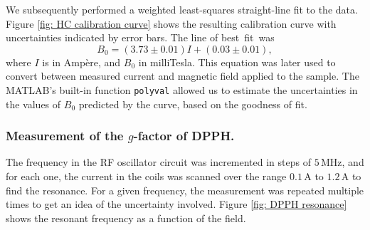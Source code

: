 \documentclass[a4paper]{jpconf}
\numberwithin{equation}{section}
\begin{document}
We subsequently performed a weighted least-squares straight-line fit to the data. Figure \ref{fig: HC calibration curve} shows the resulting calibration curve with uncertainties indicated by error bars. The line of best~fit~was 
\[
B_0 = (3.73 \pm 0.01) I + (0.03 \pm 0.01),
\]
where $I$ is in Amp\`ere, and $B_0$ in milliTesla. This equation was later used to convert between measured current and magnetic field applied to the sample. The MATLAB's built-in function \texttt{polyval} allowed us to estimate the uncertainties in the values of $B_0$ predicted by the curve, based on the goodness of fit.


\subsubsection{Measurement of the $g$-factor of DPPH.}
The frequency in the RF oscillator circuit was incremented in steps of $5 \, \si{\mega\hertz}$, and for each one, the current in the coils was scanned over the range $0.1 \, \si{\ampere}$ to $1.2 \, \si{\ampere}$ to find the resonance. For a given frequency, the measurement was repeated multiple times to get an idea of the uncertainty involved. Figure \ref{fig: DPPH resonance} shows the resonant frequency as a function of the field.
\end{document}
